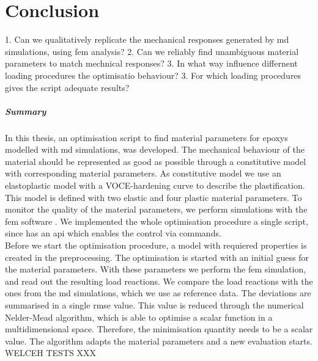 \chapter{Conclusion}
1. Can we qualitatively replicate the mechanical responses generated by \acrshort{md} simulations, using \acrshort{fem} analysis? 
2. Can we reliably find unambiguous material parameters to match mechnical responses?
3. In what way influence differnent loading procedures the optimisatio behaviour?
3. For which loading procedures gives the script adequate results? 


\paragraph{Summary}
In this thesis, an optimisation script to find material parameters for epoxys modelled with \acrshort{md} simulations, was developed. The mechanical behaviour of the material should be represented as good as possible through a constitutive model with corresponding material parameters. As constitutive model we use an elastoplastic model with a VOCE-hardening curve to describe the plastification. This model is defined with two elastic and four plastic material parameters. To monitor the quality of the material parameters, we perform simulations with the \acrshort{fem} software . We implemented the whole optimisation procedure a single  script, since  has an \acrlong{api} which enables the control via  commands. \\
Before we start the optimisation procedure, a model with requiered properties is created in the preprocessing. The optimisation is started with an initial guess for the material parameters. With these parameters we perform the \acrshort{fem} simulation, and read out the resulting load reactions. We compare the load reactions with the ones from the \acrshort{md} simulations, which we use as reference data. The deviations are summarised in a single \acrshort{rmse} value. This value is reduced through the numerical Nelder-Mead algorithm, which is able to optimise a scalar function in a multidimensional space. Therefore, the minimisation quantity needs to be a scalar value. The algorithm adapts the material parameters and a new evaluation starts. 
WELCEH TESTS XXX


